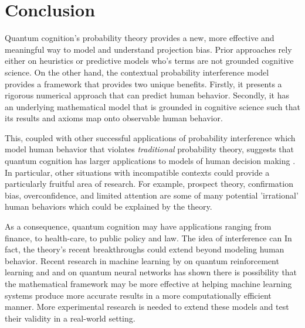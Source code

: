 \documentclass[12pt]{article}
\begin{document}
	\section{Conclusion}
	Quantum cognition's probability theory provides a new, more effective and meaningful way to model and understand projection bias. Prior approaches rely either on heuristics or predictive models who's terms are not grounded cognitive science. On the other hand, the contextual probability interference model provides a framework that provides two unique benefits. 
	Firstly, it presents a rigorous numerical approach that can predict human behavior. Secondly, it has an underlying mathematical model that is grounded in cognitive science such that its results and axioms map onto observable human behavior.  
	
	This, coupled with other successful applications of probability interference which model human behavior that violates \textit{traditional} probability theory, suggests that quantum cognition has larger applications to models of human decision making \cite{bruza_wang_busemeyer_2015, khrennikov_haven_2009}. In particular, other situations with incompatible contexts could provide a particularly fruitful area of research. For example, prospect theory, confirmation bias, overconfidence, and limited attention are some of many potential 'irrational' human behaviors which could be explained by the theory. 
	
	As a consequence, quantum cognition may have applications ranging from finance, to health-care, to public policy and law. The idea of interference can In fact, the theory's recent breakthroughs could extend beyond modeling human behavior. Recent research in machine learning by \cite{dong_li_tarn_2008} on quantum reinforcement learning and \cite{Farhi-a} and \cite{kouda2005} on quantum neural networks has shown there is possibility that the mathematical framework may be more effective at helping machine learning systems produce more accurate results in a more computationally efficient manner. More experimental research is needed to extend these models and test their validity in a real-world setting. 
	


\end{document}
